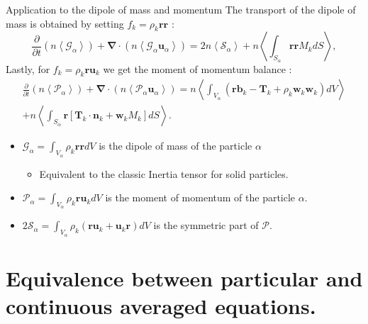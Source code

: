 \documentclass{sintefbeamer}
\newcommand{\pavg}[1]{n \left<#1\right>}
\newcommand{\nablab}{\bm{\nabla}}
\newcommand{\pddt}{\frac{\partial}{\partial t}}
\begin{document}
\begin{frame}
  {Application to the dipole of mass and momentum}
  The transport of the dipole of mass is obtained by setting $f_k = \rho_k \textbf{rr}$ :
  \begin{equation*}
    \pddt   \left(\pavg{\mathcal{G}_\alpha}\right)
    + \nablab \cdot \left(\pavg{\mathcal{G}_\alpha \textbf{u}_\alpha}\right) 
    = 2 \pavg{\mathcal{S}_\alpha}
    + \pavg{\int_{S_\alpha} \textbf{rr} M_k dS},
\end{equation*}
  Lastly, for $f_k = \rho_k \textbf{r} \textbf{u}_k$ we get the moment of momentum balance :
  \begin{multline}
    \pddt   \left(\pavg{\mathcal{P}_\alpha}\right)
    + \nablab \cdot \left(\pavg{\mathcal{P}_\alpha \textbf{u}_\alpha}\right) 
    = \pavg{\int_{V_\alpha} \left( 
        \textbf{r} \textbf{b}_k 
        - \textbf{T}_k
        + \rho_k \textbf{w}_k  \textbf{w}_k 
    \right) dV}\\
    + \pavg{
    \int_{S_\alpha} \textbf{r} \left[
        \textbf{T}_k \cdot \textbf{n}_k
        + \textbf{w}_k M_k
    \right] dS}.
\end{multline}
\begin{itemize}
  \item $\mathcal{G}_\alpha = \int_{V_\alpha} \rho_k\textbf{rr} dV$ is the dipole of mass of the particle $\alpha$ 
  \begin{itemize}
    \item Equivalent to the classic Inertia tensor for solid particles. 
  \end{itemize}
  \item $\mathcal{P}_\alpha = \int_{V_\alpha} \rho_k \textbf{r}\textbf{u}_k dV$ is the moment of momentum of the particle $\alpha$.
  \item $2\mathcal{S}_\alpha = \int_{V_\alpha} \rho_k (\textbf{r}\textbf{u}_k+\textbf{u}_k\textbf{r}) dV$ is the symmetric part of $\mathcal{P}$. 
\end{itemize}
\end{frame}

\section{Equivalence between particular and continuous averaged equations.}
\end{document}
